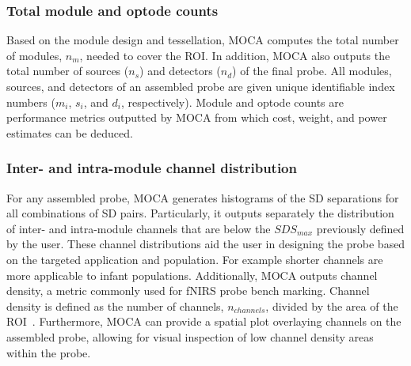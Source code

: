 \subsubsection{Total module and optode counts}
Based on the module design and tessellation, MOCA computes the total number of modules, $n_m$, needed to cover the ROI. In addition, MOCA also outputs the total number of sources ($n_s$) and detectors ($n_d$) of the final probe. All modules, sources, and detectors of an assembled probe are given unique identifiable index numbers ($m_i$, $s_i$, and $d_i$, respectively). Module and optode counts are performance metrics outputted by MOCA from which cost, weight, and power estimates can be deduced.

\subsubsection{Inter- and intra-module channel distribution}
For any assembled probe, MOCA generates histograms of the SD separations for all combinations of SD pairs. Particularly, it outputs separately the distribution of inter- and intra-module channels that are below the $SDS_{max}$ previously defined by the user. These channel distributions aid the user in designing the probe based on the targeted application and population. For example shorter channels are more applicable to infant populations. Additionally, MOCA outputs channel density, a metric commonly used for fNIRS probe bench marking. Channel density is defined as the number of channels, $n_{channels}$, divided by the area of the ROI~\cite{Zhao2017}. Furthermore, MOCA can provide a spatial plot overlaying channels on the assembled probe, allowing for visual inspection of low channel density areas within the probe. 

